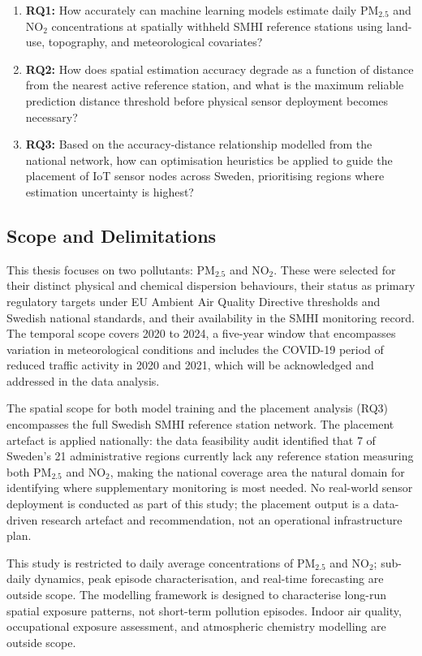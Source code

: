 \documentclass[11pt,a4paper]{article}
\let\oldsubsection\subsection
\renewcommand{\subsection}{\FloatBarrier\oldsubsection}
\begin{document}
\begin{enumerate}
    \item \textbf{RQ1:} How accurately can machine learning models estimate daily PM$_{2.5}$ and NO$_2$ concentrations at spatially withheld SMHI reference stations using land-use, topography, and meteorological covariates?
    \item \textbf{RQ2:} How does spatial estimation accuracy degrade as a function of distance from the nearest active reference station, and what is the maximum reliable prediction distance threshold before physical sensor deployment becomes necessary?
    \item \textbf{RQ3:} Based on the accuracy-distance relationship modelled from the national network, how can optimisation heuristics be applied to guide the placement of IoT sensor nodes across Sweden, prioritising regions where estimation uncertainty is highest?
\end{enumerate}

\subsection{Scope and Delimitations}
\label{sec:scope}

This thesis focuses on two pollutants: PM$_{2.5}$ and NO$_2$. These were selected for their distinct physical and chemical dispersion behaviours, their status as primary regulatory targets under EU Ambient Air Quality Directive thresholds and Swedish national standards, and their availability in the SMHI monitoring record. The temporal scope covers 2020 to 2024, a five-year window that encompasses variation in meteorological conditions and includes the COVID-19 period of reduced traffic activity in 2020 and 2021, which will be acknowledged and addressed in the data analysis.

The spatial scope for both model training and the placement analysis (RQ3) encompasses the full Swedish SMHI reference station network. The placement artefact is applied nationally: the data feasibility audit identified that 7 of Sweden's 21 administrative regions currently lack any reference station measuring both PM$_{2.5}$ and NO$_2$, making the national coverage area the natural domain for identifying where supplementary monitoring is most needed. No real-world sensor deployment is conducted as part of this study; the placement output is a data-driven research artefact and recommendation, not an operational infrastructure plan.

This study is restricted to daily average concentrations of PM$_{2.5}$ and NO$_2$; sub-daily dynamics, peak episode characterisation, and real-time forecasting are outside scope. The modelling framework is designed to characterise long-run spatial exposure patterns, not short-term pollution episodes. Indoor air quality, occupational exposure assessment, and atmospheric chemistry modelling are outside scope.
\end{document}
